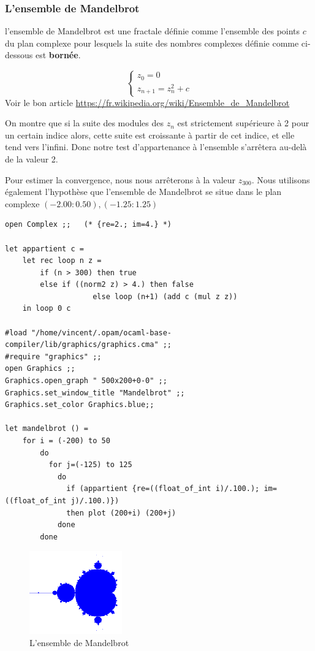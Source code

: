 \documentclass[11pt]{book}
\begin{document}
\subsubsection{L'ensemble de Mandelbrot}
l'ensemble de Mandelbrot est une fractale définie comme l'ensemble des points $c$ 
du plan complexe pour lesquels la suite des nombres complexes définie comme ci-dessous est 
\textbf{bornée}.

$$
\begin{cases}
	z_0=0\\
	z_{n+1}=z_n^2+c
\end{cases}
$$
Voir le bon article \url{https://fr.wikipedia.org/wiki/Ensemble_de_Mandelbrot}

On montre que si la suite des modules des $z_n$ est strictement supérieure à 2 pour un certain indice alors,
cette suite est croissante à partir de cet indice, et elle tend vers l'infini.
Donc notre test d'appartenance à l'ensemble s'arrêtera au-delà de la valeur 2.

Pour estimer la convergence, nous nous arrêterons à la valeur $z_{300}$.
Nous utilisons également l'hypothèse que l'ensemble de Mandelbrot se situe dans le plan complexe
$(-2.00:0.50), (-1.25:1.25)$
\begin{Verbatim}
open Complex ;;   (* {re=2.; im=4.} *)

let appartient c =
	let rec loop n z =
		if (n > 300) then true
		else if ((norm2 z) > 4.) then false
					else loop (n+1) (add c (mul z z)) 
	in loop 0 c  

#load "/home/vincent/.opam/ocaml-base-compiler/lib/graphics/graphics.cma" ;;
#require "graphics" ;; 
open Graphics ;;
Graphics.open_graph " 500x200+0-0" ;;
Graphics.set_window_title "Mandelbrot" ;;
Graphics.set_color Graphics.blue;;

let mandelbrot () =
	for i = (-200) to 50
		do
		  for j=(-125) to 125
			do
			  if (appartient {re=((float_of_int i)/.100.); im=((float_of_int j)/.100.)}) 
			  then plot (200+i) (200+j) 
			done
		done 
\end{Verbatim}

\begin{figure}[H]
	\centering
	\caption{L'ensemble de Mandelbrot}
	\includegraphics[width=4.0cm]{mandelbrot.png}
\end{figure}
\end{document}
